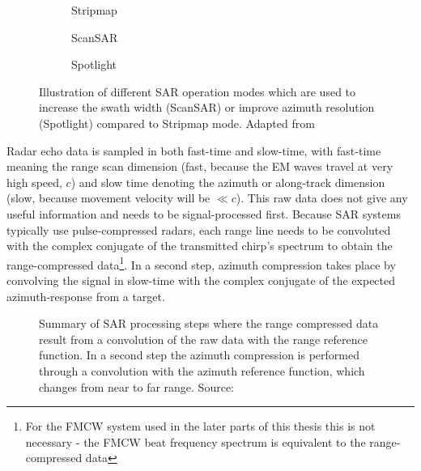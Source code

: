 \begin{figure}[htp]
    \begin{subfigure}{\linewidth}
        \centering
        \def\svgscale{1.0}
        
        \caption{Stripmap}
        \bigskip
    \end{subfigure}
    \begin{subfigure}{0.45\linewidth}
        \centering
        \def\svgscale{0.75}
        
        \caption{ScanSAR}
    \end{subfigure}
    \hfill
    \begin{subfigure}{0.45\linewidth}
        \centering
        \def\svgscale{0.75}
        
        \caption{Spotlight}
    \end{subfigure}
    \caption{\label{fig:sar_modes}Illustration of different SAR operation modes which are used to increase the swath width (ScanSAR) or improve azimuth resolution (Spotlight) compared to Stripmap mode. Adapted from \cite{Moreira2013}}
\end{figure}

Radar echo data is sampled in both fast-time and slow-time, with
fast-time meaning the range scan dimension (fast, because the EM waves
travel at very high speed, \(c\)) and slow time denoting the azimuth or
along-track dimension (slow, because movement velocity will be
\(\ll c\)). This raw data does not give any useful information and needs
to be signal-processed first. Because SAR systems typically use
pulse-compressed radars, each range line needs to be convoluted with the
complex conjugate of the transmitted chirp's spectrum to obtain the
range-compressed
data\footnote{For the FMCW system used in the later parts of this thesis this is not necessary - the FMCW beat frequency spectrum is equivalent to the range-compressed data}.
In a second step, azimuth compression takes place by convolving the
signal in slow-time with the complex conjugate of the expected
azimuth-response from a target.

\begin{figure}[htp]
    \centering
    \def\svgwidth{\linewidth}
    
    \caption{\label{fig_sar_steps}Summary of SAR processing steps where the range compressed data result from a convolution of the raw data with the range reference function. In a second step the azimuth compression is performed through a convolution with the azimuth reference function, which changes from near to far range. Source: \cite{Moreira2013}}
\end{figure}

